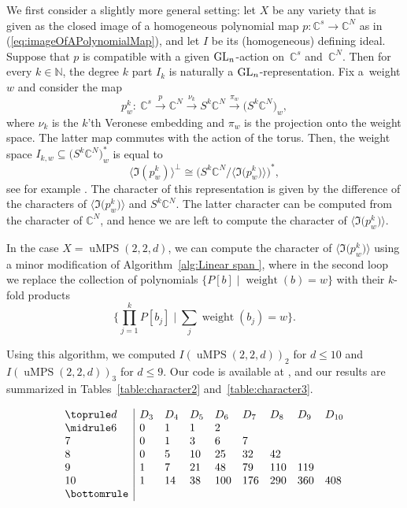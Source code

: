 \documentclass[pdftex]{sigma}
\numberwithin{equation}{section}
\newcommand{\CC}{\mathbb{C}}
\DeclareMathOperator{\uMPS}{uMPS}
\begin{document}
We first consider a slightly more general setting:
let $X$ be any variety that is given as the closed image of a homogeneous polynomial map $p\colon \CC^s \to \CC^N$ as in (\ref{eq:imageOfAPolynomialMap}), and let $I$ be its (homogeneous) defining ideal. Suppose that $p$ is compatible with a given ${\rm GL}_n$-action on~$\CC^s$ and~$\CC^N$. Then for every $k \in {\mathbb N}$, the degree $k$ part $I_k$ is naturally a ${\rm GL}_n$-representation. Fix a~weight $w$ and consider the map
\[
p^k_w\colon \  \CC^s \xrightarrow{p} \CC^N \xrightarrow{\nu_k} S^k\CC^N \xrightarrow{\pi_w} \big(S^k\CC^N\big)_w,
\]
where $\nu_k$ is the $k$'th Veronese embedding and $\pi_w$ is the projection onto the weight space. The latter map commutes with the action of the torus.
Then, the weight space $I_{k,w} \subseteq \big(S^k\CC^N\big)_w^*$ is equal to
\[ \big\langle \Im(p^k_w) \big\rangle^\perp \cong \big({S^k \CC^N} / {\big\langle \Im\big( p^k_w\big) \big\rangle} \big)^*,\]
see for example  \cite[Proposition~4.4.1.1]{landsberg2012tensors}.
The character of this representation is given by the difference of the characters of $\big\langle \Im\big(p^k_w\big) \big\rangle$ and $S^k \CC^N$. The latter character can be computed from the character of $\CC^N$, and hence we are left to compute the character of $\big\langle \Im\big(p^k_w\big) \big\rangle$.

In the case $X=\uMPS(2,2,d)$, we can compute the character of $\big\langle \Im\big(p^k_w\big) \big\rangle$ using a minor modification of Algorithm~\ref{alg:Linear span }, where in the second loop we replace the collection of polynomials
$\{P[b] \mid \operatorname{weight}(b) = w \}$
with their $k$-fold products
\[ \bigg\{\prod_{j=1}^{k} P[b_j] \mid \sum_j \operatorname{weight}(b_j) = w \bigg\}.\]

Using this algorithm, we computed $I(\uMPS(2,2,d))_2$ for $d\leq 10$ and $I(\uMPS(2,2,d))_3$ for $d\leq 9$. Our code is available at \cite{code}, and our results are summarized in Tables~\ref{table:character2} and~\ref{table:character3}.

 \begin{table}[th!]\centering
	\caption{Character of $I(\uMPS(2,2,d))^*_2$. Since $D_{w}=D_{2d-w}$ (again: for every ${\rm GL}_2$-representation $V$ we have that $V_{(b_0,b_1)}=V_{(b_1,b_0)}$),  we only list $D_w$ for $w \leq d$.}  \label{table:character2}

\vspace{-5mm}

$$
	\begin{array}{l|llllllll}
	\toprule
	d & D_3 	& D_4 & D_5 & D_6 & D_7 & D_8 & D_9 & D_{10}\\
	\midrule
	6 & 0   & 1  & 1  & 2   &     &     &     &     \\
	7 & 0   & 1  & 3  & 6   & 7   &     &     &     \\
	8 & 0   & 5  & 10 & 25  & 32  & 42  &     &     \\
	9 &  1  & 7  & 21 &  48 & 79  & 110 & 119 &     \\
	10 &  1 & 14 & 38 & 100 & 176 & 290 & 360 & 408 \\
	\bottomrule
	\end{array}$$
\vspace{-2mm}
\end{table}
\end{document}
